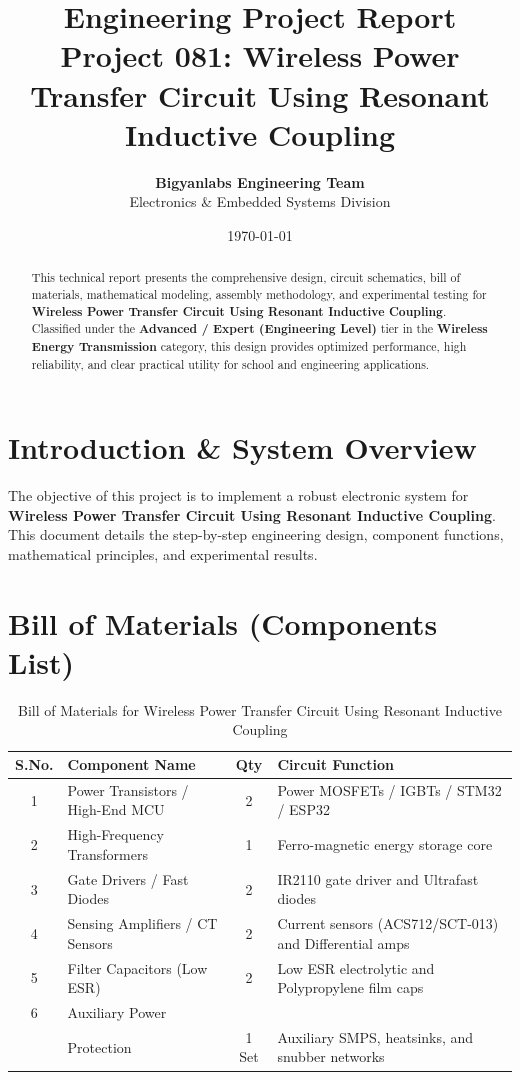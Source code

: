 \documentclass[11pt,a4paper]{article}
\title{\textbf{\Huge Engineering Project Report}\\[0.5em] \Large Project 081: Wireless Power Transfer Circuit Using Resonant Inductive Coupling}
\author{\textbf{Bigyanlabs Engineering Team}\\ Electronics \& Embedded Systems Division}
\date{\today}
\begin{document}
\maketitle
\thispagestyle{empty}

\begin{abstract}
This technical report presents the comprehensive design, circuit schematics, bill of materials, mathematical modeling, assembly methodology, and experimental testing for \textbf{Wireless Power Transfer Circuit Using Resonant Inductive Coupling}. Classified under the \textbf{Advanced / Expert (Engineering Level)} tier in the \textbf{Wireless Energy Transmission} category, this design provides optimized performance, high reliability, and clear practical utility for school and engineering applications.
\end{abstract}

\newpage
\tableofcontents
\newpage

\section{Introduction \& System Overview}
The objective of this project is to implement a robust electronic system for \textbf{Wireless Power Transfer Circuit Using Resonant Inductive Coupling}. This document details the step-by-step engineering design, component functions, mathematical principles, and experimental results.

\section{Bill of Materials (Components List)}
\begin{table}[h!]
\centering
\caption{Bill of Materials for Wireless Power Transfer Circuit Using Resonant Inductive Coupling}
\vspace{0.5em}
\begin{tabular}{clcp{7cm}}
\toprule
\textbf{S.No.} & \textbf{Component Name} & \textbf{Qty} & \textbf{Circuit Function} \\
\midrule
1 & Power Transistors / High-End MCU & 2 & Power MOSFETs / IGBTs / STM32 / ESP32 \\
2 & High-Frequency Transformers & 1 & Ferro-magnetic energy storage core \\
3 & Gate Drivers / Fast Diodes & 2 & IR2110 gate driver and Ultrafast diodes \\
4 & Sensing Amplifiers / CT Sensors & 2 & Current sensors (ACS712/SCT-013) and Differential amps \\
5 & Filter Capacitors (Low ESR) & 2 & Low ESR electrolytic and Polypropylene film caps \\
6 & Auxiliary Power \\& Protection & 1 Set & Auxiliary SMPS, heatsinks, and snubber networks \\
\bottomrule
\end{tabular}
\end{table}
\end{document}
